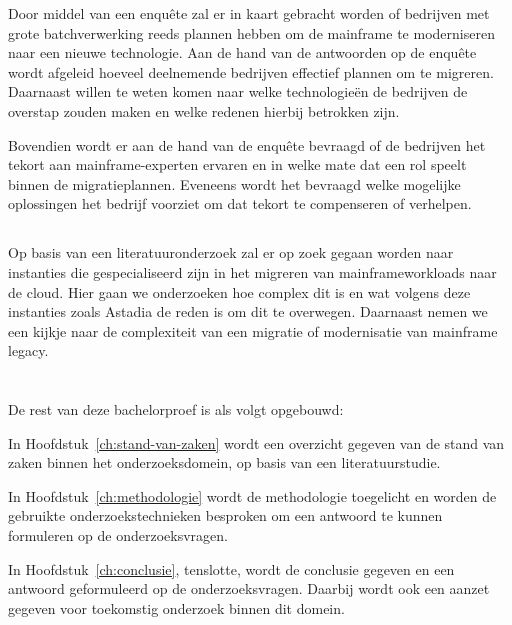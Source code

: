 Door middel van een enquête zal er in kaart gebracht worden of bedrijven met grote batchverwerking reeds plannen hebben om de mainframe te moderniseren naar een nieuwe technologie. Aan de hand van de antwoorden op de enquête wordt afgeleid hoeveel deelnemende bedrijven effectief plannen om te migreren. Daarnaast willen te weten komen naar welke technologieën de bedrijven de overstap zouden maken en welke redenen hierbij betrokken zijn. 

Bovendien wordt er aan de hand van de enquête bevraagd of de bedrijven het tekort aan mainframe-experten ervaren en in welke mate dat een rol speelt binnen de migratieplannen. Eveneens wordt het bevraagd welke mogelijke oplossingen het bedrijf voorziet om dat tekort te compenseren of verhelpen. 

\subsection{}

Op basis van een literatuuronderzoek zal er op zoek gegaan worden naar instanties die gespecialiseerd zijn in het migreren van mainframeworkloads naar de cloud. Hier gaan we onderzoeken hoe complex dit is en wat volgens deze instanties zoals Astadia de reden is om dit te overwegen. Daarnaast nemen we een kijkje naar de complexiteit van een migratie of modernisatie van mainframe legacy.

\section{}
\label{sec:opzet-bachelorproef}


De rest van deze bachelorproef is als volgt opgebouwd:

In Hoofdstuk~\ref{ch:stand-van-zaken} wordt een overzicht gegeven van de stand van zaken binnen het onderzoeksdomein, op basis van een literatuurstudie.

In Hoofdstuk~\ref{ch:methodologie} wordt de methodologie toegelicht en worden de gebruikte onderzoekstechnieken besproken om een antwoord te kunnen formuleren op de onderzoeksvragen.


In Hoofdstuk~\ref{ch:conclusie}, tenslotte, wordt de conclusie gegeven en een antwoord geformuleerd op de onderzoeksvragen. Daarbij wordt ook een aanzet gegeven voor toekomstig onderzoek binnen dit domein.
